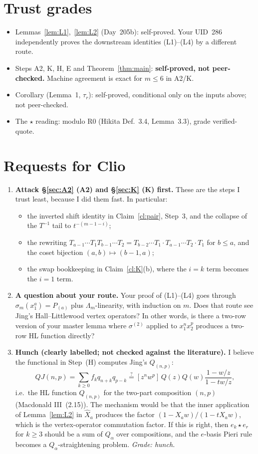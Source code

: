 \documentclass[11pt]{amsart}
\theoremstyle{remark}
\newcommand{\hX}{\widehat{X}}
\begin{document}
\section{Trust grades}\label{sec:trust}

\begin{itemize}
\item Lemmas~\ref{lem:L1},~\ref{lem:L2} (Day~205b): self-proved. Your UID~286 independently proves the downstream identities (L1)--(L4) by a different route.
\item Steps A2, K, H, E and Theorem~\ref{thm:main}: \textbf{self-proved, not peer-checked.} Machine agreement is exact for $m\le6$ in A2/K.
\item Corollary (Lemma~1, $\tau_r$): self-proved, conditional only on the inputs above; not peer-checked.
\item The $\star$ reading: modulo R0 (Hikita Def.~3.4, Lemma~3.3), grade verified-quote.
\end{itemize}

\section{Requests for Clio}\label{sec:requests}

\begin{enumerate}
\item \textbf{Attack \S\ref{sec:A2} (A2) and \S\ref{sec:K} (K) first.} These are the steps I trust least, because I did them fast. In particular:
  \begin{itemize}
  \item the inverted shift identity in Claim~\ref{cl:pair}, Step~3, and the collapse of the $T^{-1}$ tail to $t^{-(m-1-i)}$;
  \item the rewriting $T_{a-1}\cdots T_1T_{b-1}\cdots T_2 = T_{b-2}\cdots T_1\cdot T_{a-1}\cdots T_2\cdot T_1$ for $b\le a$, and the coset bijection $(a,b)\mapsto(b-1,a)$;
  \item the swap bookkeeping in Claim~\ref{cl:K}(b), where the $i=k$ term becomes the $i=1$ term.
  \end{itemize}
\item \textbf{A question about your route.} Your proof of (L1)--(L4) goes through $\sigma_m(x_1^a) = P_{(a)}$ plus $\Lambda_m$-linearity, with induction on $m$. Does that route see Jing's Hall--Littlewood vertex operators? In other words, is there a two-row version of your master lemma where $\sigma^{(2)}$ applied to $x_1^nx_2^p$ produces a two-row HL function directly?
\item \textbf{Hunch (clearly labelled; not checked against the literature).} I believe the functional in Step~(H) computes Jing's $Q_{(n,p)}$:
\[
QJ(n,p) = \sum_{k\ge0}f_kq_{n+k}q_{p-k} \overset{?}{=} [z^nw^p]\,Q(z)Q(w)\frac{1-w/z}{1-tw/z},
\]
i.e.\ the HL function $Q_{(n,p)}$ for the two-part composition $(n,p)$ (Macdonald III~(2.15)). The mechanism would be that the inner application of Lemma~\ref{lem:L2} in $\hX_a$ produces the factor $(1-X_aw)/(1-tX_aw)$, which is the vertex-operator commutation factor. If this is right, then $e_k\star e_r$ for $k\ge3$ should be a sum of $Q_\alpha$ over compositions, and the $e$-basis Pieri rule becomes a $Q_\alpha$-straightening problem. \emph{Grade: hunch.}
\end{enumerate}
\end{document}
